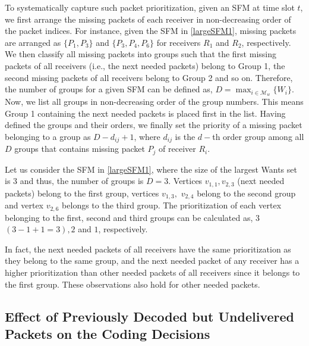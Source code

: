\documentclass[12pt, peerreview, onecolumn]{IEEEtran}
\begin{document}
To systematically  capture such  packet prioritization, given an SFM at time slot $t$, we first arrange  the missing packets  of each receiver in non-decreasing order of the  packet indices.  For instance, given the SFM in \eqref{largeSFM1}, missing packets are arranged as $\{P_1,P_3\}$ and $\{P_3,P_4,P_6\}$ for receivers $R_1$ and $R_2$, respectively. We  then classify all  missing packets into groups  such that    the first missing packets of all receivers (i.e., the next needed packets) belong to  Group 1, the second missing packets of all receivers belong to  Group 2 and so on. Therefore,  the   number of groups for a given SFM can be defined as, $D = \max_{i \in \mathcal{M}_w}\{W_i\}$. Now, we list all groups in non-decreasing order of the group numbers. This means   Group 1 containing the next needed packets is placed first in the list.  Having defined the  groups and their orders, we finally set the priority of a missing packet belonging to a group as $D - d_{ij} +1$, where $d_{ij}$ is the   $d-$th order group among all $D$ groups that contains missing packet $P_j$ of receiver $R_i$. 


\begin{examples} Let us consider the SFM in  \eqref{largeSFM1}, where  the size of the largest Wants set is 3  and thus, the number of groups is $D = 3$. Vertices $v_{1,1}, v_{2,3}$ (next needed packets)\footnotemark {}  belong to the first group,  vertices $v_{1,3},$ $v_{2,4}$ belong to the second group  and  vertex $v_{2,6}$ belongs to the third group. The prioritization of each vertex belonging to the first, second and third  groups can be calculated as, $3$  $(3 - 1 +1 = 3), 2$ and $1$, respectively.
\end{examples}

In fact, the next needed packets of all receivers  have the same prioritization as they belong to the same group, and the next needed packet of any receiver has a higher prioritization than  other needed packets of all receivers since it belongs to the first group. These observations also hold for other needed packets.

\vspace{-5mm}
\subsection{Effect of  Previously Decoded but Undelivered Packets on the Coding Decisions}\label{sec:receiver}
\end{document}
